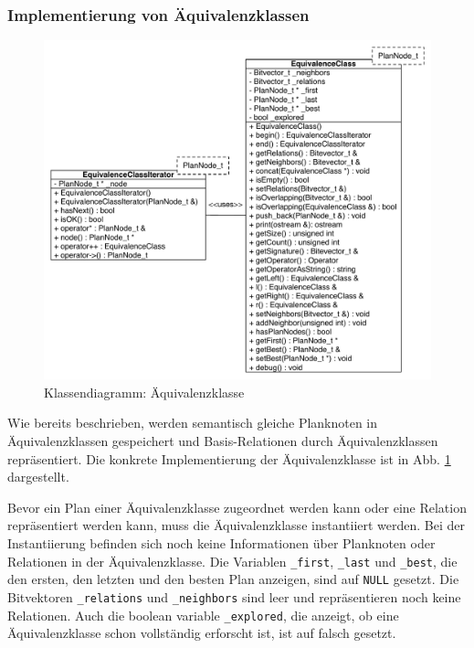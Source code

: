 \subsubsection{Implementierung von Äquivalenzklassen}

\begin{figure}[ht]
  \centering
  \includegraphics[scale=0.75]{04_Implementierung/00_media/ClassEquivalenceClass.pdf}
  \caption{Klassendiagramm: Äquivalenzklasse}
  \label{ClassEquivalenceClass}
\end{figure}


Wie bereits beschrieben, werden semantisch gleiche Planknoten in Äquivalenzklassen gespeichert und Basis-Relationen durch Äquivalenzklassen repräsentiert. Die konkrete Implementierung der Äquivalenzklasse ist in Abb. \ref{ClassEquivalenceClass} dargestellt.

Bevor ein Plan einer Äquivalenzklasse zugeordnet werden kann oder eine Relation repräsentiert werden kann, muss die Äquivalenzklasse instantiiert werden. Bei der Instantiierung befinden sich noch keine Informationen über Planknoten oder Relationen in der Äquivalenzklasse. Die Variablen \texttt{\_first}, \texttt{\_last} und \texttt{\_best}, die den ersten, den letzten und den besten Plan anzeigen, sind auf \texttt{NULL} gesetzt. Die Bitvektoren \texttt{\_relations} und \texttt{\_neighbors} sind leer und repräsentieren noch keine Relationen. Auch die boolean variable \texttt{\_explored}, die anzeigt, ob eine Äquivalenzklasse schon vollständig erforscht ist, ist auf falsch gesetzt.


